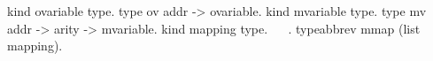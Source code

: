 \begin{elpicode}
  kind ovariable type.
  type ov addr -> ovariable.
  kind mvariable type.
  type mv addr -> arity -> mvariable.
  kind mapping type.
  ~  ~.
  typeabbrev mmap (list mapping).
\end{elpicode}
